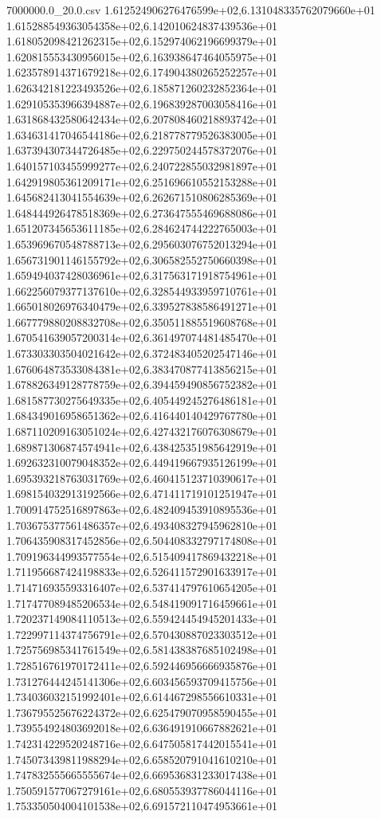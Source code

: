 \begin{filecontents*}{7000000.0_20.0.csv}
1.612524906276476599e+02,6.131048335762079660e+01
1.615288549363054358e+02,6.142010624837439536e+01
1.618052098421262315e+02,6.152974062196699379e+01
1.620815553430956015e+02,6.163938647464055975e+01
1.623578914371679218e+02,6.174904380265252257e+01
1.626342181223493526e+02,6.185871260232852364e+01
1.629105353966394887e+02,6.196839287003058416e+01
1.631868432580642434e+02,6.207808460218893742e+01
1.634631417046544186e+02,6.218778779526383005e+01
1.637394307344726485e+02,6.229750244578372076e+01
1.640157103455999277e+02,6.240722855032981897e+01
1.642919805361209171e+02,6.251696610552153288e+01
1.645682413041554639e+02,6.262671510806285369e+01
1.648444926478518369e+02,6.273647555469688086e+01
1.651207345653611185e+02,6.284624744222765003e+01
1.653969670548788713e+02,6.295603076752013294e+01
1.656731901146155792e+02,6.306582552750660398e+01
1.659494037428036961e+02,6.317563171918754961e+01
1.662256079377137610e+02,6.328544933959710761e+01
1.665018026976340479e+02,6.339527838586491271e+01
1.667779880208832708e+02,6.350511885519608768e+01
1.670541639057200314e+02,6.361497074481485470e+01
1.673303303504021642e+02,6.372483405202547146e+01
1.676064873533084381e+02,6.383470877413856215e+01
1.678826349128778759e+02,6.394459490856752382e+01
1.681587730275649335e+02,6.405449245276486181e+01
1.684349016958651362e+02,6.416440140429767780e+01
1.687110209163051024e+02,6.427432176076308679e+01
1.689871306874574941e+02,6.438425351985642919e+01
1.692632310079048352e+02,6.449419667935126199e+01
1.695393218763031769e+02,6.460415123710390617e+01
1.698154032913192566e+02,6.471411719101251947e+01
1.700914752516897863e+02,6.482409453910895536e+01
1.703675377561486357e+02,6.493408327945962810e+01
1.706435908317452856e+02,6.504408332797174808e+01
1.709196344993577554e+02,6.515409417869432218e+01
1.711956687424198833e+02,6.526411572901633917e+01
1.714716935593316407e+02,6.537414797610654205e+01
1.717477089485206534e+02,6.548419091716459661e+01
1.720237149084110513e+02,6.559424454945201433e+01
1.722997114374756791e+02,6.570430887023303512e+01
1.725756985341761549e+02,6.581438387685102498e+01
1.728516761970172411e+02,6.592446956666935876e+01
1.731276444245141306e+02,6.603456593709415756e+01
1.734036032151992401e+02,6.614467298556610331e+01
1.736795525676224372e+02,6.625479070958590455e+01
1.739554924803692018e+02,6.636491910667882621e+01
1.742314229520248716e+02,6.647505817442015541e+01
1.745073439811988294e+02,6.658520791041610210e+01
1.747832555665555674e+02,6.669536831233017438e+01
1.750591577067279161e+02,6.680553937786044116e+01
1.753350504004101538e+02,6.691572110474953661e+01

\end{filecontents*}
